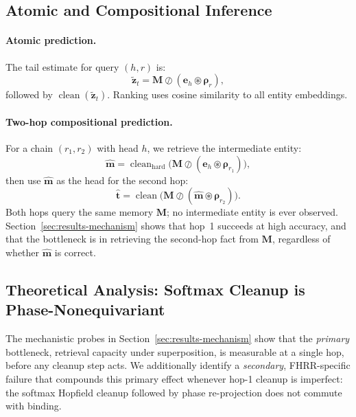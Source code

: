 \documentclass[11pt]{article}
\theoremstyle{definition}
\newcommand{\bind}{\circledast}
\newcommand{\unbind}{\oslash}
\newcommand{\ev}[1]{\mathbf{e}_{#1}}
\newcommand{\rv}[1]{\boldsymbol{\rho}_{#1}}
\newcommand{\mem}{\mathbf{M}}
\DeclareMathOperator{\cleanupop}{clean}
\begin{document}
\subsection{Atomic and Compositional Inference}
\label{sec:method-inference}

\paragraph{Atomic prediction.}
The tail estimate for query $(h, r)$ is:
\begin{equation}
  \tilde{\mathbf{z}}_t = \mem \unbind (\ev{h} \bind \rv{r}),
  \label{eq:atomic-query}
\end{equation}
followed by $\cleanupop(\tilde{\mathbf{z}}_t)$. Ranking uses cosine similarity
to all entity embeddings.

\paragraph{Two-hop compositional prediction.}
For a chain $(r_1, r_2)$ with head $h$, we retrieve the intermediate entity:
\begin{equation}
  \hat{\mathbf{m}} = \cleanupop_{\mathrm{hard}}\!\bigl(\mem \unbind (\ev{h} \bind \rv{r_1})\bigr),
  \label{eq:hop1}
\end{equation}
then use $\hat{\mathbf{m}}$ as the head for the second hop:
\begin{equation}
  \hat{\mathbf{t}} = \cleanupop\!\bigl(\mem \unbind (\hat{\mathbf{m}} \bind \rv{r_2})\bigr).
  \label{eq:hop2}
\end{equation}
Both hops query the same memory $\mem$; no intermediate entity is ever observed.
Section~\ref{sec:results-mechanism} shows that hop~1 succeeds at high accuracy,
and that the bottleneck is in retrieving the second-hop fact from $\mem$,
regardless of whether $\hat{\mathbf{m}}$ is correct.

\subsection{Theoretical Analysis: Softmax Cleanup is Phase-Nonequivariant}
\label{sec:theory}

The mechanistic probes in Section~\ref{sec:results-mechanism} show that the
\emph{primary} bottleneck, retrieval capacity under superposition, is
measurable at a single hop, before any cleanup step acts. We additionally
identify a \emph{secondary}, FHRR-specific failure that compounds this primary
effect whenever hop-1 cleanup is imperfect: the softmax Hopfield cleanup
followed by phase re-projection does not commute with binding.
\end{document}
